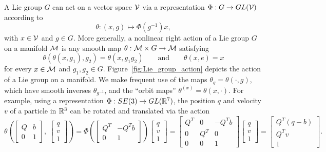 \documentclass[twoside,11pt]{article}
\begin{document}
A Lie group $G$ can act on a vector space ${\mathcal{V}}$ via a representation $\Phi: G \to GL({\mathcal{V}})$ according to
\begin{equation}
    \theta: (x, g) \mapsto \Phi(g^{-1}) x,
    \label{eqn:right_action_by_representation}
\end{equation}
with $x\in{\mathcal{V}}$ and $g \in G$.
More generally, a nonlinear right action of a Lie group $G$ on a manifold ${\mathcal{M}}$ is any smooth map $\theta: {\mathcal{M}} \times G \to {\mathcal{M}}$ satisfying 
\begin{equation}
    \theta(\theta(x, g_1), g_2) = \theta(x, g_1 g_2) \qquad \mbox{and} \qquad \theta(x, e) = x
\end{equation}
for every $x\in{\mathcal{M}}$ and $g_1, g_2\in G$.
Figure~\ref{fig:Lie_group_action} depicts the action of a Lie group on a manifold.
We make frequent use of the maps $\theta_g = \theta (\cdot, g)$, which have smooth inverses $\theta_{g^{-1}}$, and the ``orbit maps'' $\theta^{(x)} = \theta(x, \cdot)$.
For example, using a representation $\Phi : SE(3) \to GL(\mathbb{R}^7)$, the position $q$ and velocity $v$ of a particle in $\mathbb{R}^3$ 
can be rotated and translated via the action
\begin{equation*}
    \theta\left( 
    \begin{bmatrix} 
    Q & b \\ 
    0 & 1\end{bmatrix}, \ \begin{bmatrix}
        q \\
        v \\
        1
    \end{bmatrix} \right)
    =
    \Phi\left( \begin{bmatrix} 
        Q^T & -Q^T b \\ 
        0 & 1 \end{bmatrix} \right) 
    \begin{bmatrix}
        q \\
        v \\
        1
    \end{bmatrix}
    = 
    \begin{bmatrix} 
    Q^T & 0 & -Q^T b \\ 
    0 & Q^T & 0 \\ 
    0 & 0 & 1\end{bmatrix}
    \begin{bmatrix}
        q \\
        v \\
        1
    \end{bmatrix} = 
    \begin{bmatrix}
        Q^T (q - b) \\
        Q^T v \\
        1
    \end{bmatrix}.
\end{equation*}
\end{document}
